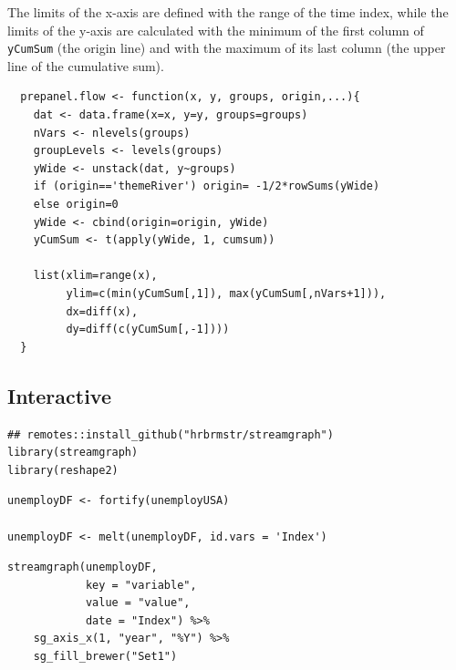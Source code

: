 \documentclass[smallroyalvopaper]{memoir}
\begin{document}
The limits of the x-axis are defined with the range of the time index,
while the limits of the y-axis are calculated with the minimum of the
first column of \texttt{yCumSum} (the origin line) and with the maximum of
its last column (the upper line of the cumulative sum).

\lstset{language=r,label= ,caption= ,captionpos=b,numbers=none}
\begin{lstlisting}
  prepanel.flow <- function(x, y, groups, origin,...){
    dat <- data.frame(x=x, y=y, groups=groups)
    nVars <- nlevels(groups)
    groupLevels <- levels(groups)
    yWide <- unstack(dat, y~groups)
    if (origin=='themeRiver') origin= -1/2*rowSums(yWide)
    else origin=0
    yWide <- cbind(origin=origin, yWide)
    yCumSum <- t(apply(yWide, 1, cumsum))
  
    list(xlim=range(x),
         ylim=c(min(yCumSum[,1]), max(yCumSum[,nVars+1])),
         dx=diff(x),
         dy=diff(c(yCumSum[,-1])))
  }
\end{lstlisting}

\subsection{Interactive \label{sec:interactive}}
\label{sec:orgfdeed7f}

\lstset{language=r,label= ,caption= ,captionpos=b,numbers=none}
\begin{lstlisting}
## remotes::install_github("hrbrmstr/streamgraph")
library(streamgraph)
library(reshape2)
\end{lstlisting}

\lstset{language=r,label= ,caption= ,captionpos=b,numbers=none}
\begin{lstlisting}
unemployDF <- fortify(unemployUSA)

unemployDF <- melt(unemployDF, id.vars = 'Index')
\end{lstlisting}

\lstset{language=r,label= ,caption= ,captionpos=b,numbers=none}
\begin{lstlisting}
streamgraph(unemployDF,
            key = "variable",
            value = "value",
            date = "Index") %>%
    sg_axis_x(1, "year", "%Y") %>%
    sg_fill_brewer("Set1")
\end{lstlisting}
\end{document}
